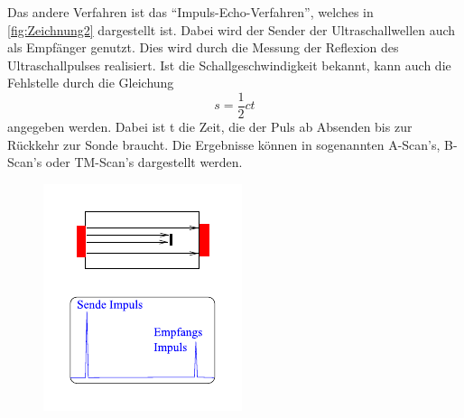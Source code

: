 Das andere Verfahren ist das \enquote{Impuls-Echo-Verfahren}, welches in \autoref{fig:Zeichnung2} dargestellt ist.
Dabei wird der Sender der Ultraschallwellen auch als Empfänger genutzt.
Dies wird durch die Messung der Reflexion des Ultraschallpulses realisiert.
Ist die Schallgeschwindigkeit bekannt, kann auch die Fehlstelle durch die Gleichung
\begin{equation} \label{eq:wegzeit}
    s = \frac{1}{2} c t
\end{equation}
angegeben werden. Dabei ist t die Zeit, die der Puls ab Absenden bis zur Rückkehr zur Sonde braucht.
Die Ergebnisse können in sogenannten A-Scan's, B-Scan's oder TM-Scan's dargestellt werden.
\begin{figure}
    \centering
    \begin{minipage}[t]{.45\linewidth}
      \centering
      \includegraphics[width=\linewidth]{pictures/Zeichnung1.pdf}
      \label{fig:Zeichnung1}
    \end{minipage}%
    \hfill%
    \begin{minipage}[t]{.45\linewidth}
      \centering

\end{minipage}
\end{figure}

